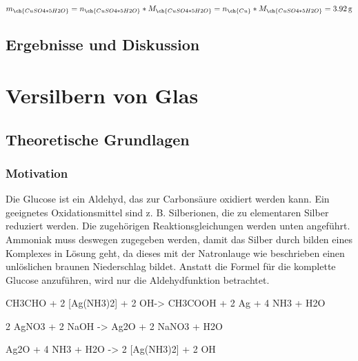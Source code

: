 \documentclass{article}
\begin{document}
        \begin{equation}
          m_{\ch{CuSO4 * 5 H2O}} = n_{\ch{CuSO4 * 5 H2O}} * M_{\ch{CuSO4 * 5 H2O}} = n_{\ch{Cu}}  * M_{\ch{CuSO4 * 5 H2O}} = \SI[mode=text]{3.92}{\gram}
        \end{equation}
        
    \subsection{Ergebnisse und Diskussion}
  
  \pagebreak
  
  \section{Versilbern von Glas}
  
    \subsection{Theoretische Grundlagen}
      
      \subsubsection{Motivation}
      
        Die Glucose ist ein Aldehyd, das zur Carbonsäure oxidiert werden kann. Ein geeignetes Oxidationsmittel sind z. B.  Silberionen, die zu elementaren Silber reduziert werden. Die zugehörigen Reaktionsgleichungen werden unten angeführt. Ammoniak muss deswegen zugegeben werden, damit das Silber durch bilden eines Komplexes in Lösung geht, da dieses mit der Natronlauge wie beschrieben einen unlöslichen braunen Niederschlag bildet. Anstatt die Formel für die komplette Glucose anzuführen, wird nur die Aldehydfunktion betrachtet.
        
        \begin{reaction}
          CH3CHO\aq{} + 2 [Ag(NH3)2]\pch\aq{} + 2 OH\mch\aq -> CH3COOH\aq{} + 2 Ag\sld{} + 4 NH3\aq{} + H2O \\
        \end{reaction}
        
        \begin{reaction}
          2 AgNO3\aq{} + 2 NaOH\aq{} -> Ag2O\sld{} + 2 NaNO3\aq{} + H2O\\
        \end{reaction}
        
        \begin{reaction}
          Ag2O\sld{} + 4 NH3\sld{} + H2O -> 2 [Ag(NH3)2]\pch\aq{} + 2 OH\mch\aq \\
        \end{reaction}
        
\end{document}
